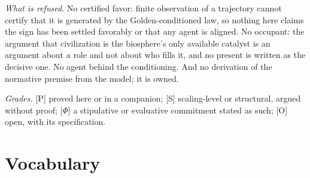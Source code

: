 \documentclass[11pt]{article}
\theoremstyle{plain}
\theoremstyle{definition}
\theoremstyle{remark}
\begin{document}
\emph{What is refused.} No certified favor: finite observation of a
trajectory cannot certify that it is generated by the Golden-conditioned
law, so nothing here claims the sign has been settled favorably or that
any agent is aligned. No occupant: the argument that civilization is
the biosphere's only available catalyst is an argument about a role and
not about who fills it, and no present is written as the decisive one.
No agent behind the conditioning. And no derivation of the normative
premise from the model; it is owned.

\emph{Grades.} [P] proved here or in a companion; [S] scaling-level or
structural, argued without proof; [$\Phi$] a stipulative or evaluative
commitment stated as such; [O] open, with its specification.

\section{Vocabulary}\label{sec:vocab}
\end{document}
